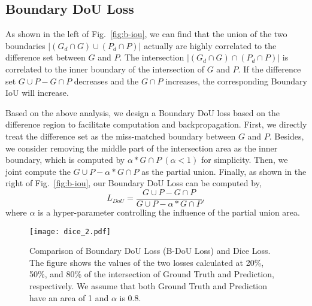 \documentclass[runningheads]{llncs}
\begin{document}
\subsection{Boundary DoU Loss}
As shown in the left of Fig.~\ref{fig:b-iou}, we can find that the union of the two boundaries $|(G_d\cap G)\cup (P_d\cap P)|$ actually are highly correlated to the difference set between $G$ and $P$. The intersection $|(G_d\cap G)\cap(P_d\cap P)|$ is correlated to the inner boundary of the intersection of $G$ and $P$. If the difference set $G\cup P-G\cap P$ decreases and the $G\cap P$ increases, the corresponding Boundary IoU will increase.

Based on the above analysis, we design a Boundary DoU loss based on the difference region to facilitate computation and backpropagation. First, we directly treat the difference set as the miss-matched boundary between $G$ and $P$. Besides, we consider removing the middle part of the intersection area as the inner boundary, which is computed by $\alpha * G\cap P~(\alpha<1)$ for simplicity. Then, we joint compute the $G\cup P- \alpha *  G\cap P$ as the partial union. Finally, 
as shown in the right of Fig.~\ref{fig:b-iou}, our Boundary DoU Loss can be computed by,
\begin{equation}
L_{DoU}= \frac{G\cup P-G\cap P}{G\cup P- \alpha *  G\cap P},
\end{equation}
where $\alpha$ is a hyper-parameter controlling the influence of the partial union area. 


\begin{figure}[t]
\centering
\texttt{[image: dice\_2.pdf]}
\caption{Comparison of Boundary DoU Loss (B-DoU Loss) and Dice Loss. The figure shows the values of the two losses calculated at 20\%, 50\%, and 80\% of the intersection of Ground Truth and Prediction, respectively. We assume that both Ground Truth and Prediction have an area of 1 and $\alpha$ is 0.8.}
\label{fig:dice}
\end{figure}
\end{document}
